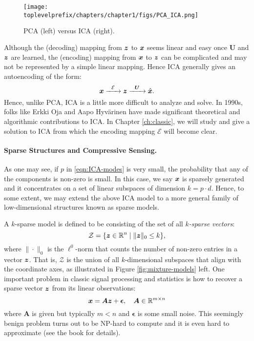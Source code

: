 \documentclass[../../book-main.tex]{subfiles}
\begin{document}
\begin{figure}
    \centering
    \texttt{[image: \\toplevelprefix/chapters/chapter1/figs/PCA\_ICA.png]}
    \caption{PCA (left) versus ICA (right).}
    \label{fig:ICA-PCA}
\end{figure}

Although the (decoding) mapping from $\bm{z}$ to $\bm{x}$ seems linear and easy once $\boldsymbol{U}$ and $\bm{z}$ are learned, the (encoding) mapping from $\bm{x}$ to $\bm{z}$ can be complicated and may not be represented by a simple linear mapping. Hence ICA generally gives an autoencoding of the form:
\begin{equation}
    \bm{x}   \xrightarrow{\hspace{2mm} \mathcal{E}\hspace{2mm}} \bm{z}  \xrightarrow{\hspace{2mm} \boldsymbol{U} \hspace{2mm}} \hat {\bm{x}}.
       \label{eqn:auto-encoding-ICA}
\end{equation}
Hence, unlike PCA, ICA is a little more difficult to analyze and solve. In 1990s, folks like Erkki Oja and Aapo Hyv\"{a}rinen \cite{hyvarinen-1997,Hyvrinen-2000} have made significant theoretical and algorithmic contributions to ICA. In Chapter \ref{ch:classic}, we will study and give a solution to ICA from which the encoding mapping $\mathcal{E}$ will become clear.



\paragraph{Sparse Structures and Compressive Sensing.}
As one may see, if $p$ in \eqref{eqn:ICA-modes} is very small, the probability that any of the components is non-zero is small. In this case, we say $\bm{x}$ is sparsely generated and it concentrates on a set of linear subspaces of dimension $k = p \cdot d$. Hence, to some extent, we may extend the above ICA model to a more general family of low-dimensional structures known as sparse models. 

A $k$-sparse model is defined to be consisting of the set of all {\em $k$-sparse vectors}:
\begin{equation}
    \mathcal{Z} = \{\bm{z} \in \mathbb{R}^n \mid \|\bm{z}\|_0 \le k\},
\end{equation}
where $\| \cdot \|_0$ is the $\ell^0$-norm that counts the number of non-zero entries in a vector $\bm{z}$. That is, $\mathcal{Z}$ is the union of all $k$-dimensional subspaces that align with the coordinate axes, as illustrated in Figure \ref{fig:mixture-models} left. One important problem in classic signal processing and statistics is how to recover a sparse vector $\bm{z}$ from its linear observations:
\begin{equation}
    \bm{x} = \boldsymbol{A} \bm{z} + \boldsymbol{\epsilon}, \quad \boldsymbol{A} \in \mathbb{R}^{m\times n}
    \label{eqn:sparse-model}
\end{equation}
where $\boldsymbol{A}$ is given but typically $m < n$ and $\boldsymbol{\epsilon}$ is some small noise. This seemingly benign problem turns out to be NP-hard to compute and it is even hard to approximate (see the book \cite{Wright-Ma-2022} for details). 
\end{document}
